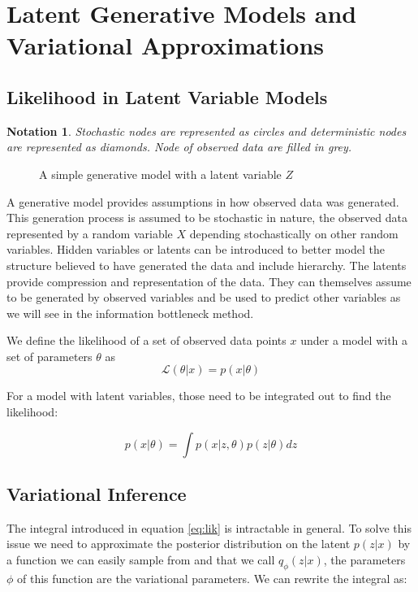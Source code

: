 \documentclass[11pt,oneside,openright]{report}
\newtheorem{notation}{Notation}
\begin{document}
\section{Latent Generative Models and Variational Approximations}
\subsection{Likelihood in Latent Variable Models}
\begin{notation}
Stochastic nodes are represented as circles and deterministic nodes are represented as diamonds. Node of observed data are filled in grey.
\end{notation}

\begin{figure}[H]
\centering
{}
\caption{A simple generative model with a latent variable $Z$}
\end{figure}

A generative model provides assumptions in how observed data was generated. This generation process is assumed to be stochastic in nature, the observed data represented by a random variable $X$ depending stochastically on other random variables. Hidden variables or latents can be introduced to better model the structure believed to have generated the data and include hierarchy. The latents provide compression and representation of the data. They can themselves assume to be generated by observed variables and be used to predict other variables as we will see in the information bottleneck method. 

We define the likelihood of a set of observed data points $x$ under a model with a set of parameters $\theta$ as 
$$\mathcal{L}(\theta|x) = p(x|\theta)$$

For a model with latent variables, those need to be integrated out to find the likelihood:

\begin{equation}
p(x|\theta) = \int p(x|z, \theta) p(z|\theta) dz
\label{eq:lik}
\end{equation}

\subsection{Variational Inference}
The integral introduced in equation \ref{eq:lik} is intractable in general. To solve this issue we need to approximate the posterior distribution on the latent $p(z|x)$ by a function we can easily sample from and that we call $q_\phi(z|x)$, the parameters $\phi$ of this function are the variational parameters. We can rewrite the integral as:
\end{document}
